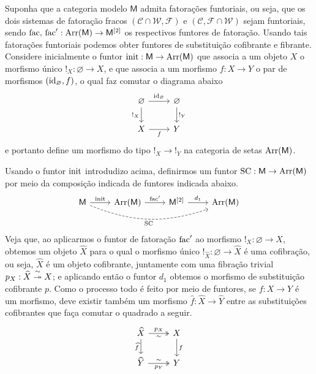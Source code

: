 \begin{obs}
  \label{obs:substituicoes_cofibrantes_fibrantes_funtoriais}
  Suponha que a categoria modelo $\mathsf{M}$ admita fatorações funtoriais, ou seja, que os dois sistemas de fatoração fracos $(\mathcal{C} \cap \mathcal{W},\mathcal{F})$ e $(\mathcal{C},\mathcal{F} \cap \mathcal{W})$ sejam funtoriais, sendo $\mathrm{fac},\, \mathrm{fac}': \mathrm{Arr}(\mathsf{M}) \to \mathsf{M}^{[2]}$ os respectivos funtores de fatoração.
  Usando tais fatorações funtoriais podemos obter funtores de substituição cofibrante e fibrante.
  Considere inicialmente o funtor $\mathrm{init}: \mathsf{M} \to \mathrm{Arr}(\mathsf{M})$ que associa a um objeto $X$ o morfismo único $!_{X}: \varnothing \to X$, e que associa a um morfismo $f: X \to Y$ o par de morfismos $(\mathrm{id}_{\varnothing},f)$, o qual faz comutar o diagrama abaixo
  \begin{displaymath}
    \begin{tikzcd}
      \varnothing
      \arrow[d, "!_{X}" swap]
      \arrow[r, "\id_{\varnothing}"]
      & \varnothing
      \arrow[d, "!_{Y}"]
      \\ X
      \arrow[r, "f" swap]
      & Y
    \end{tikzcd}
  \end{displaymath}
  e portanto define um morfismo do tipo $!_{X} \to !_{Y}$ na categoria de setas $\mathrm{Arr}(\mathsf{M})$.

  Usando o funtor $\mathrm{init}$ introdudizo acima, definirmos um funtor $\mathrm{SC}: \mathsf{M} \to \mathrm{Arr}(\mathsf{M})$ por meio da composição indicada de funtores indicada abaixo.
  \begin{displaymath}
    \begin{tikzcd}
      \mathsf{M}
      \arrow[r, "\init"]
      \arrow[rrr, dashed, bend right=20, "\mathrm{SC}" swap]
      & \Arr(\mathsf{M})
      \arrow[r, "\fac'"]
      & \mathsf{M}^{[2]}
      \arrow[r, "d_{1}"]
      & \Arr(\mathsf{M})
    \end{tikzcd}
  \end{displaymath}
  Veja que, ao aplicarmos o funtor de fatoração $\mathrm{fac}'$ ao morfismo $!_{X}: \varnothing \to X$, obtemos um objeto $\widehat{X}$ para o qual o morfismo único $!_{\widehat{X}}: \varnothing \to \widehat{X}$ é uma cofibração, ou seja, $\widehat{X}$ é um objeto cofibrante, juntamente com uma fibração trivial $p_{X}: \widehat{X} \overset{\sim}{\twoheadrightarrow} X$; e aplicando então o funtor $d_{1}$ obtemos o morfismo de substituição cofibrante $p$.
  Como o processo todo é feito por meio de funtores, se $f: X \to Y$ é um morfismo, deve existir também um morfismo $\widehat{f}: \widehat{X} \to \widehat{Y}$ entre as substituições cofibrantes que faça comutar o quadrado a seguir.
  \begin{displaymath}
    \begin{tikzcd}
      \widehat{X}
      \arrow[r, two heads, "p_{X}", "\sim" {swap}]
      \arrow[d, "\widehat{f}" swap]
      & X
      \arrow[d, "f"]
      \\ \widehat{Y}
      \arrow[r, two heads, "\sim", "p_{Y}" {swap}]
      & Y
    \end{tikzcd}
  \end{displaymath}


\end{obs}
